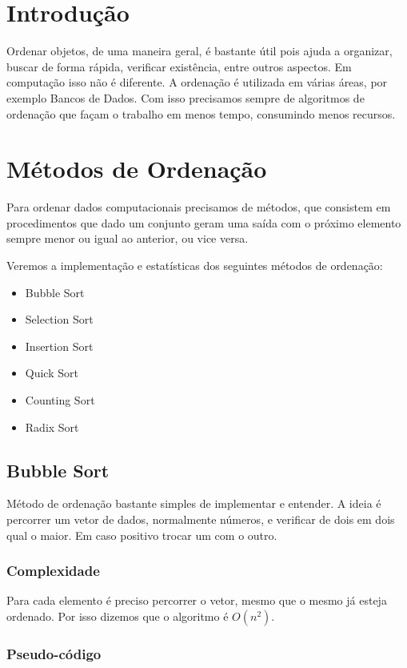 \section{Introdução}

Ordenar objetos, de uma maneira geral, é bastante útil pois ajuda a
organizar, buscar de forma rápida, verificar existência, entre outros
aspectos. Em computação isso não é diferente. A ordenação é utilizada em
várias áreas, por exemplo Bancos de Dados. Com isso precisamos sempre de
algoritmos de ordenação que façam o trabalho em menos tempo, consumindo
menos recursos.

\section{Métodos de Ordenação}

Para ordenar dados computacionais precisamos de métodos, que consistem
em procedimentos que dado um conjunto geram uma saída com o próximo
elemento sempre menor ou igual ao anterior, ou vice versa.

Veremos a implementação e estatísticas dos seguintes métodos de
ordenação:

\begin{itemize}
\item
  Bubble Sort
\item
  Selection Sort
\item
  Insertion Sort
\item
  Quick Sort
\item
  Counting Sort
\item
  Radix Sort
\end{itemize}
\subsection{Bubble Sort}

Método de ordenação bastante simples de implementar e entender. A ideia
é percorrer um vetor de dados, normalmente números, e verificar de dois
em dois qual o maior. Em caso positivo trocar um com o outro.

\subsubsection{Complexidade}

Para cada elemento é preciso percorrer o vetor, mesmo que o mesmo já
esteja ordenado. Por isso dizemos que o algoritmo é $O(n^2)$.

\subsubsection{Pseudo-código}

